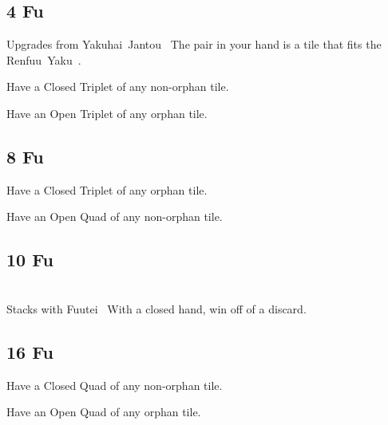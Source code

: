 \subsection{4 Fu}\label{core:ssec:4-fu}

	{\upgradesfrom Upgrades from Yakuhai~Jantou~}
	{The pair in your hand is a tile that fits the Renfuu~Yaku~.}

	{}
	{Have a Closed Triplet of any non-orphan tile.}

	{}
	{Have an Open Triplet of any orphan tile.}


\subsection{8 Fu}\label{core:ssec:8-fu}

	{}
	{Have a Closed Triplet of any orphan tile.}

	{}
	{Have an Open Quad of any non-orphan tile.}


\subsection{10 Fu}\label{core:ssec:10-fu}

	{\closedhand \\
	\upgradesfrom Stacks with Fuutei~}
	{With a closed hand, win off of a discard.}


\subsection{16 Fu}\label{core:ssec:16-fu}

	{}
	{Have a Closed Quad of any non-orphan tile.}

	{}
	{Have an Open Quad of any orphan tile.}



